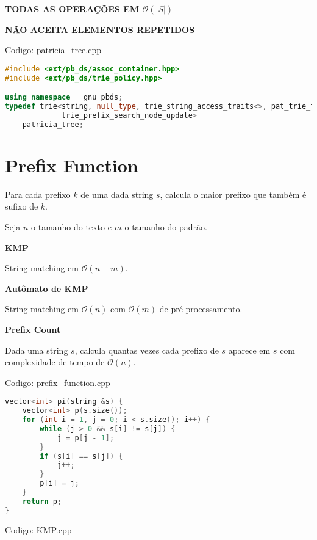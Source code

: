 \documentclass[10pt, a4paper, oneside]{book}
\begin{document}
\textbf{TODAS AS OPERAÇÕES EM $\mathcal{O}(|S|)$}  

\textbf{NÃO ACEITA ELEMENTOS REPETIDOS}

\hfill

Codigo: patricia\_tree.cpp

\begin{lstlisting}[language=C++]
#include <ext/pb_ds/assoc_container.hpp>
#include <ext/pb_ds/trie_policy.hpp>

using namespace __gnu_pbds;
typedef trie<string, null_type, trie_string_access_traits<>, pat_trie_tag,
             trie_prefix_search_node_update>
    patricia_tree;
\end{lstlisting}
\hfill

\section{Prefix Function}


Para cada prefixo $k$ de uma dada string $s$, calcula o maior prefixo que também é sufixo de $k$.



Seja $n$ o tamanho do texto e $m$ o tamanho do padrão.



\textbf{KMP} 



String matching em $\mathcal{O}(n + m)$.



\textbf{Autômato de KMP} 



String matching em $\mathcal{O}(n)$ com $\mathcal{O}(m)$ de pré-processamento.



\textbf{Prefix Count} 



Dada uma string $s$, calcula quantas vezes cada prefixo de $s$ aparece em $s$ com complexidade de tempo de $\mathcal{O}(n)$.
\hfill

Codigo: prefix\_function.cpp

\begin{lstlisting}[language=C++]
vector<int> pi(string &s) {
    vector<int> p(s.size());
    for (int i = 1, j = 0; i < s.size(); i++) {
        while (j > 0 && s[i] != s[j]) {
            j = p[j - 1];
        }
        if (s[i] == s[j]) {
            j++;
        }
        p[i] = j;
    }
    return p;
}
\end{lstlisting}
\hfill

Codigo: KMP.cpp
\end{document}
